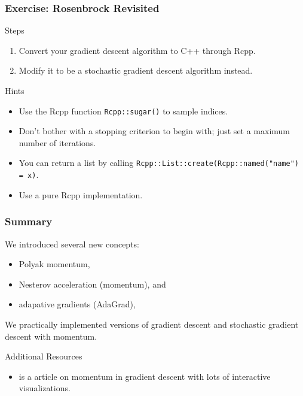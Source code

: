 \documentclass[aspectratio=1610,onlytextwidth]{beamer}
\begin{document}
\begin{frame}[c]
  \frametitle{Exercise: Rosenbrock Revisited}

  \begin{block}{Steps}
    \begin{enumerate}
      \item Convert your gradient descent algorithm to C++ through Rcpp.
      \item Modify it to be a stochastic gradient descent algorithm instead.
    \end{enumerate}
  \end{block}

  \pause\bigskip

  \begin{block}{Hints}
    \begin{itemize}
      \item Use the Rcpp function \texttt{Rcpp::sugar()} to sample indices.
      \item Don't bother with a stopping criterion to begin with; just set a maximum number of
            iterations.
      \item You can return a list by calling \texttt{Rcpp::List::create(Rcpp::named("name") = x)}.
      \item Use a pure Rcpp implementation.
    \end{itemize}
  \end{block}

\end{frame}

\begin{frame}[c]
  \frametitle{Summary}

  We introduced several new concepts:
  \begin{itemize}
    \item Polyak momentum,
    \item Nesterov acceleration (momentum), and
    \item adapative gradients (AdaGrad),
  \end{itemize}

  \bigskip

  We practically implemented versions of gradient descent and stochastic gradient
  descent with momentum.

  \pause\bigskip

  \begin{block}{Additional Resources}
    \begin{itemize}
      \item \textcite{gohWhyMomentumReally2017} is a article on momentum
            in gradient descent with lots of interactive visualizations.
    \end{itemize}
  \end{block}
\end{frame}
\end{document}
